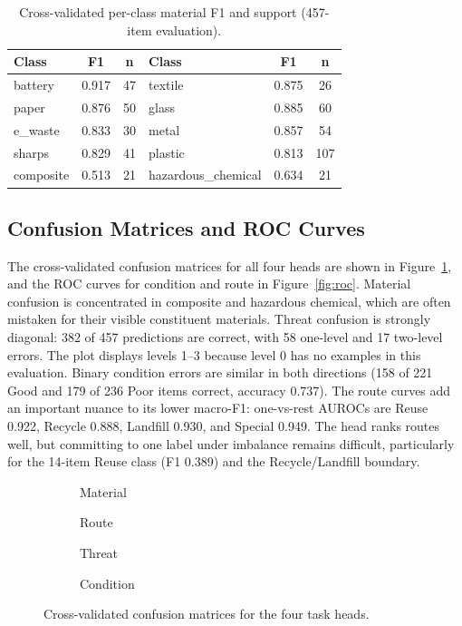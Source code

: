 \begin{table}[!h]
\centering
\caption{Cross-validated per-class material F1 and support (457-item evaluation).}
\label{tab:perclass}
\begin{tabular}{lcc|lcc}
\toprule
\textbf{Class} & \textbf{F1} & \textbf{n} & \textbf{Class} & \textbf{F1} & \textbf{n} \\
\midrule
battery & 0.917 & 47 & textile & 0.875 & 26 \\
paper & 0.876 & 50 & glass & 0.885 & 60 \\
e\_waste & 0.833 & 30 & metal & 0.857 & 54 \\
sharps & 0.829 & 41 & plastic & 0.813 & 107 \\
composite & 0.513 & 21 & hazardous\_chemical & 0.634 & 21 \\
\bottomrule
\end{tabular}
\end{table}

\subsection{Confusion Matrices and ROC Curves}
The cross-validated confusion matrices for all four heads are shown in Figure~\ref{fig:confusion}, and the ROC curves for condition and route in Figure~\ref{fig:roc}. Material confusion is concentrated in composite and hazardous chemical, which are often mistaken for their visible constituent materials. Threat confusion is strongly diagonal: 382 of 457 predictions are correct, with 58 one-level and 17 two-level errors. The plot displays levels 1--3 because level 0 has no examples in this evaluation. Binary condition errors are similar in both directions (158 of 221 Good and 179 of 236 Poor items correct, accuracy 0.737). The route curves add an important nuance to its lower macro-F1: one-vs-rest AUROCs are Reuse 0.922, Recycle 0.888, Landfill 0.930, and Special 0.949. The head ranks routes well, but committing to one label under imbalance remains difficult, particularly for the 14-item Reuse class (F1 0.389) and the Recycle/Landfill boundary.

\begin{figure}[!ht]
    \centering
    \begin{subfigure}{0.49\textwidth}\centering{}\caption{Material}\end{subfigure}\hfill
    \begin{subfigure}{0.49\textwidth}\centering{}\caption{Route}\end{subfigure}

    \vspace{0.7em}
    \begin{subfigure}{0.49\textwidth}\centering{}\caption{Threat}\end{subfigure}\hfill
    \begin{subfigure}{0.49\textwidth}\centering{}\caption{Condition}\end{subfigure}
    \caption{Cross-validated confusion matrices for the four task heads.}
    \label{fig:confusion}
\end{figure}

